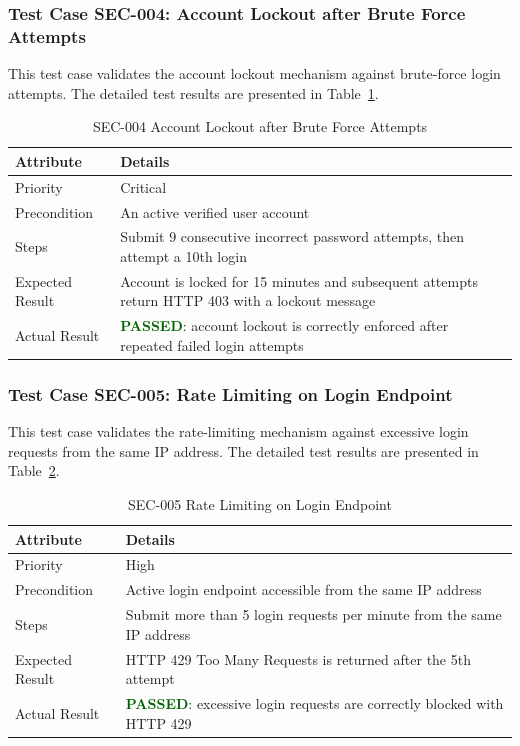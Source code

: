 \subsubsection{Test Case SEC-004: Account Lockout after Brute Force Attempts}

This test case validates the account lockout mechanism against brute-force login attempts. The detailed test results are presented in Table~\ref{tab:sec004}.

\begin{table}[H]
\centering
\caption{SEC-004 Account Lockout after Brute Force Attempts}
\label{tab:sec004}
\renewcommand{\arraystretch}{1.3}

\begin{tabular}{|p{2cm}|p{13cm}|}
\hline
\rowcolor{red!10}
\textbf{Attribute} & \textbf{Details} \\
\hline
Priority & Critical \\
\hline
Precondition & An active verified user account \\
\hline
Steps & Submit 9 consecutive incorrect password attempts, then attempt a 10th login \\
\hline
Expected Result & Account is locked for 15 minutes and subsequent attempts return HTTP 403 with a lockout message \\
\hline
Actual Result & \textbf{\textcolor{darkgreen}{PASSED}}: account lockout is correctly enforced after repeated failed login attempts \\
\hline
\end{tabular}
\end{table}

\subsubsection{Test Case SEC-005: Rate Limiting on Login Endpoint}

This test case validates the rate-limiting mechanism against excessive login requests from the same IP address. The detailed test results are presented in Table~\ref{tab:sec005}.

\begin{table}[H]
\centering
\caption{SEC-005 Rate Limiting on Login Endpoint}
\label{tab:sec005}
\renewcommand{\arraystretch}{1.3}

\begin{tabular}{|p{2cm}|p{13cm}|}
\hline
\rowcolor{red!10}
\textbf{Attribute} & \textbf{Details} \\
\hline
Priority & High \\
\hline
Precondition & Active login endpoint accessible from the same IP address \\
\hline
Steps & Submit more than 5 login requests per minute from the same IP address \\
\hline
Expected Result & HTTP 429 Too Many Requests is returned after the 5th attempt \\
\hline
Actual Result & \textbf{\textcolor{darkgreen}{PASSED}}: excessive login requests are correctly blocked with HTTP 429 \\
\hline
\end{tabular}
\end{table}

